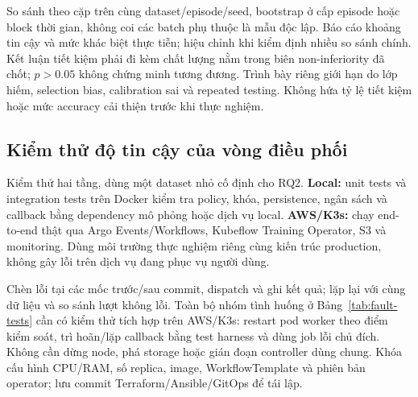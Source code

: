 So sánh theo cặp trên cùng dataset/episode/seed, bootstrap ở cấp episode hoặc block thời gian, không coi các batch phụ thuộc là mẫu độc lập. Báo cáo khoảng tin cậy và mức khác biệt thực tiễn; hiệu chỉnh khi kiểm định nhiều so sánh chính. Kết luận tiết kiệm phải đi kèm chất lượng nằm trong biên non-inferiority đã chốt; $p>0.05$ không chứng minh tương đương. Trình bày riêng giới hạn do lớp hiếm, selection bias, calibration sai và repeated testing. Không hứa tỷ lệ tiết kiệm hoặc mức accuracy cải thiện trước khi thực nghiệm.

\subsection{Kiểm thử độ tin cậy của vòng điều phối}
\label{sec:operational-tests}
Kiểm thử hai tầng, dùng một dataset nhỏ cố định cho RQ2. \textbf{Local:} unit tests và integration tests trên Docker kiểm tra policy, khóa, persistence, ngân sách và callback bằng dependency mô phỏng hoặc dịch vụ local. \textbf{AWS/K3s:} chạy end-to-end thật qua Argo Events/Workflows, Kubeflow Training Operator, S3 và monitoring. Dùng môi trường thực nghiệm riêng cùng kiến trúc production, không gây lỗi trên dịch vụ đang phục vụ người dùng.

Chèn lỗi tại các mốc trước/sau commit, dispatch và ghi kết quả; lặp lại với cùng dữ liệu và so sánh lượt không lỗi. Toàn bộ nhóm tình huống ở Bảng~\ref{tab:fault-tests} cần có kiểm thử tích hợp trên AWS/K3s: restart pod worker theo điểm kiểm soát, trì hoãn/lặp callback bằng test harness và dùng job lỗi chủ đích. Không cần dừng node, phá storage hoặc gián đoạn controller dùng chung. Khóa cấu hình CPU/RAM, số replica, image, WorkflowTemplate và phiên bản operator; lưu commit Terraform/Ansible/GitOps để tái lập.

